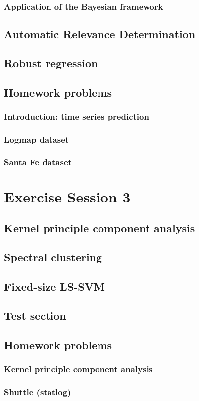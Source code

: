 \documentclass{article}
\begin{document}
        \subsubsection{Application of the Bayesian framework}
        
    \subsection{Automatic Relevance Determination}
    
    \subsection{Robust regression}
    
    \subsection{Homework problems}
        \subsubsection{Introduction: time series prediction}
        
        \subsubsection{Logmap dataset}
        
        \subsubsection{Santa Fe dataset}
    
    
\newpage
\section{Exercise Session 3}
    \subsection{Kernel principle component analysis} 
    
    \subsection{Spectral clustering} 
    
    \subsection{Fixed-size LS-SVM}
    
    \subsection*{Test section} 
    \subsection{Homework problems}
        \subsubsection{Kernel principle component analysis}
        
        \subsubsection{Shuttle (statlog)}
        
        
\end{document}
